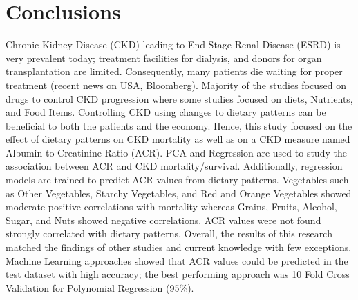 \section{Conclusions}
Chronic Kidney Disease (CKD) leading to End Stage Renal Disease (ESRD) is very prevalent today; treatment facilities for dialysis, and donors for organ transplantation are limited. Consequently, many patients die waiting for  proper treatment (recent news on USA, Bloomberg). Majority of the studies focused on drugs to control CKD progression where some studies focused on diets, Nutrients, and Food Items. Controlling CKD using changes to dietary patterns can be beneficial to both the patients and the economy. Hence, this study focused on the effect of dietary patterns on CKD mortality as well as on a CKD measure named Albumin to Creatinine Ratio (ACR). PCA and Regression are used to study the association between ACR and CKD mortality/survival. Additionally, regression models are trained to predict ACR values from dietary patterns. Vegetables such as Other Vegetables, Starchy Vegetables, and Red and Orange Vegetables showed moderate positive correlations with mortality whereas Grains, Fruits, Alcohol, Sugar, and Nuts showed negative correlations. ACR values were not found strongly correlated with dietary patterns. Overall, the results of this research matched the findings of other studies and current knowledge with few exceptions. Machine Learning approaches showed that ACR values could be predicted in the test dataset with high accuracy; the best performing approach was 10 Fold Cross Validation for Polynomial Regression (95\%).